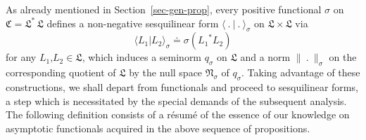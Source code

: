 \documentclass[11pt,twoside,openright]{report}
\theoremstyle{definition}
\theoremstyle{plain}
\theoremstyle{remark}
\theoremstyle{assumption}
\newcommand{\norm}[1]{\lVert #1 \rVert}
\newcommand{\scp}[2]{\langle #1 \vert #2 \rangle}
\newcommand{\Cfrak}{\mathfrak{C}}
\newcommand{\Lfrak}{\mathfrak{L}}
\newcommand{\Nfrak}{\mathfrak{N}}
\begin{document}
As already mentioned in Section~\ref{sec-gen-prop}, every positive
functional $\sigma$ on $\Cfrak = \Lfrak^* \, \Lfrak$ defines a
non-negative sesquilinear form $\scp{~.~}{~.~}_\sigma$ on $\Lfrak
\times \Lfrak$ via
\begin{equation}
  \label{eq-sesquilinear-form}
  \scp{L_1}{L_2}_\sigma \doteq \sigma ( {L_1}^* L_2 )
\end{equation}
for any $L_1 \text{,} L_2 \in \Lfrak$, which induces a seminorm
$q_\sigma$ on $\Lfrak$ and a norm $\norm{~.~}_\sigma$ on the
corresponding quotient of $\Lfrak$ by the null space $\Nfrak_\sigma$
of $q_\sigma$. Taking advantage of these constructions, we shall
depart from functionals and proceed to sesquilinear forms, a step
which is necessitated by the special demands of the subsequent
analysis. The following definition consists of a r\'{e}sum\'{e} of the
essence of our knowledge on asymptotic functionals acquired in the
above sequence of propositions.
\end{document}
